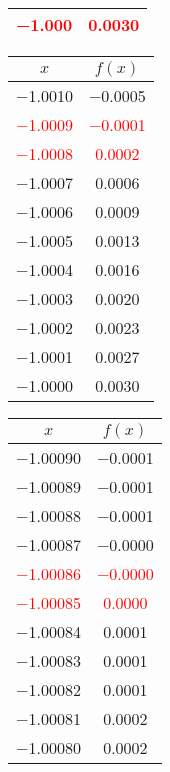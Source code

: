 \documentclass{article}
\begin{document}
\begin{enumerate}
\begin{enumerate}
\begin{tabular}{|c|c|}
            \textcolor{red}{\num{-1,000}} & \textcolor{red}{\num{0,0030}} \\
            \hline
            \end{tabular}\quad
            \begin{tabular}{|c|c|}
            \hline
            $x$   & $f(x)$ \\
            \hline
            \num{-1,0010} & \num{-0,0005} \\
            \textcolor{red}{\num{-1,0009}} & \textcolor{red}{\num{-0,0001}} \\
            \textcolor{red}{\num{-1,0008}} & \textcolor{red}{\num{0,0002}} \\
            \num{-1,0007} & \num{0,0006} \\
            \num{-1,0006} & \num{0,0009} \\
            \num{-1,0005} & \num{0,0013} \\
            \num{-1,0004} & \num{0,0016} \\
            \num{-1,0003} & \num{0,0020} \\
            \num{-1,0002} & \num{0,0023} \\
            \num{-1,0001} & \num{0,0027} \\
            \num{-1,0000} & \num{0,0030} \\
            \hline
            \end{tabular}\quad
            \begin{tabular}{|c|c|}
            \hline
            $x$   & $f(x)$ \\
            \hline
            \num{-1,00090} & \num{-0,0001} \\
            \num{-1,00089} & \num{-0,0001} \\
            \num{-1,00088} & \num{-0,0001} \\
            \num{-1,00087} & \num{-0,0000} \\
            \textcolor{red}{\num{-1,00086}} & \textcolor{red}{\num{-0,0000}} \\
            \textcolor{red}{\num{-1,00085}} & \textcolor{red}{\num{0,0000}} \\
            \num{-1,00084} & \num{0,0001} \\
            \num{-1,00083} & \num{0,0001} \\
            \num{-1,00082} & \num{0,0001} \\
            \num{-1,00081} & \num{0,0002} \\
            \num{-1,00080} & \num{0,0002} \\
            \hline
            \end{tabular}\quad \\            
            

\end{enumerate}
\end{enumerate}
\end{document}
